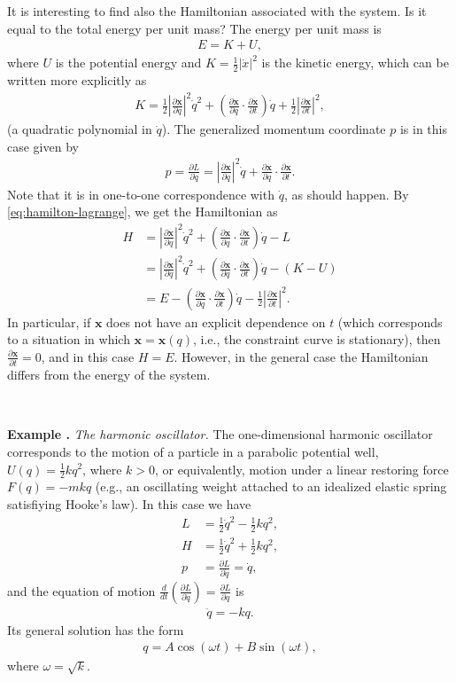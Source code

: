 \documentclass[12pt]{amsart}
\newcommand{\eqst}[1]{\begin{align*}#1\end{align*}}
\newcommand{\der}[2]{\frac{d#1}{d#2}}
\newcommand{\pder}[2]{\frac{\partial#1}{\partial#2}}
\newcounter{example}
\newcommand{\beginexample}[1]{\ \\ \addtocounter{example}{1} \textbf{Example \arabic{example}.} \textit{#1.}}
\begin{document}
It is interesting to find also the Hamiltonian associated with the system. Is it equal to the total energy per unit mass? The energy per unit mass is
\eqst{ E = K + U, }
where $U$ is the potential energy and $K = \tfrac12|\dot{x}|^2$ is the kinetic energy, which can be written more explicitly as
\eqst{
K = \tfrac12 \left|\pder{\mathbf{x}}{q}\right|^2 \dot{q}^2 + \left(\pder{\mathbf{x}}{q}\cdot\pder{\mathbf{x}}{t}\right)
\dot{q} + \tfrac12\left|\pder{\mathbf{x}}{t}\right|^2,
}
(a quadratic polynomial in $\dot{q}$). The generalized momentum coordinate $p$ is in this case given by
\eqst{
p = \pder{L}{\dot{q}} = 
\left|\pder{\mathbf{x}}{q}\right|^2 \dot{q} + \pder{\mathbf{x}}{q}\cdot\pder{\mathbf{x}}{t}.
}
Note that it is in one-to-one correspondence with $\dot{q}$, as should happen. By \eqref{eq:hamilton-lagrange}, we get the Hamiltonian as
\eqst{
H &= 
\left|\pder{\mathbf{x}}{q}\right|^2 \dot{q}^2 + \left(\pder{\mathbf{x}}{q}\cdot\pder{\mathbf{x}}{t}\right)\dot{q} - L
\\ &=
\left|\pder{\mathbf{x}}{q}\right|^2 \dot{q}^2 + \left(\pder{\mathbf{x}}{q}\cdot\pder{\mathbf{x}}{t}\right)\dot{q} - (K-U)
\\ &= E - \left(\pder{\mathbf{x}}{q}\cdot\pder{\mathbf{x}}{t}\right)\dot{q} -
\tfrac12\left|\pder{\mathbf{x}}{t}\right|^2.
}
In particular, if $\mathbf{x}$ does not have an explicit dependence on $t$ (which corresponds to a situation in which $\mathbf{x}=\mathbf{x}(q)$, i.e., the constraint curve is stationary), then $\pder{\mathbf{x}}{t}=0$, and in this case $H=E$. However, in the general case the Hamiltonian differs from the energy of the system.



\beginexample{The harmonic oscillator}
The one-dimensional harmonic oscillator corresponds to the motion of a particle in a parabolic potential well, $U(q)=\tfrac12 k q^2$, where $k>0$, or equivalently, motion under a linear restoring force $F(q)=-m k q$ (e.g., an oscillating weight attached to an idealized elastic spring satisfiying Hooke's law). In this case we have
\eqst{ 
L &= \tfrac12 \dot{q}^2 - \tfrac12 kq^2, \\ 
H &= \tfrac12 \dot{q}^2 + \tfrac12 kq^2, \\
p &= \pder{L}{\dot{q}} = \dot{q},
}
and the equation of motion $\der{}{t}\left(\pder{L}{\dot{q}}\right)=\pder{L}{q}$ is
\eqst{
\ddot{q} = -kq.
}
Its general solution has the form
\eqst{ q = A\cos(\omega t) + B \sin(\omega t), }
where $\omega= \sqrt{k}$.
\end{document}
